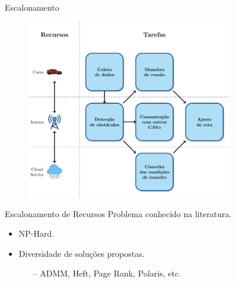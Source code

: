 

\begin{frame}{Escalonamento}
    \begin{figure}
        \centering
        \includegraphics[width=0.8\textwidth]{Figuras/cav-scheduling.png}
    \end{figure}
\end{frame}

\begin{frame}{Escalonamento de Recursos}
    Problema conhecido na literatura.
    \begin{itemize}
        \item NP-Hard.
        \item Diversidade de soluções propostas.
        \begin{itemize}
            \item[--] ADMM, Heft, Page Rank, Polaris, etc.
        \end{itemize}
    \end{itemize}
\end{frame}

